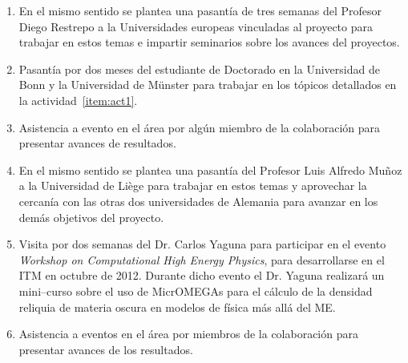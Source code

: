 \begin{enumerate}
\item En el mismo sentido se plantea una pasantía de tres semanas del
  Profesor Diego Restrepo a la Universidades europeas vinculadas al
  proyecto para trabajar en estos temas e impartir seminarios sobre
  los avances del proyectos. 
  \label{item:act5}

\item Pasantía por dos meses del estudiante de Doctorado en la
  Universidad de Bonn y la Universidad de Münster para trabajar en
  los tópicos detallados en la actividad~\ref{item:act1}.
  \label{item:act6}
\item Asistencia a evento en el área por algún miembro de la
  colaboración para presentar avances de resultados.

\item En el mismo sentido se plantea una pasantía del Profesor Luis
  Alfredo Muñoz a la Universidad de Liège para trabajar en estos temas y
  aprovechar la cercanía con las otras dos universidades de Alemania
  para avanzar en los demás objetivos del proyecto.
  \label{item:act8}
\item Visita por dos semanas del Dr. Carlos Yaguna para participar en
  el evento \emph{Workshop on Computational High Energy Physics}, para
  desarrollarse en el ITM en octubre de 2012. Durante dicho evento el
  Dr. Yaguna realizará un mini--curso sobre el uso de MicrOMEGAs para
  el cálculo de la densidad reliquia de materia oscura en modelos de física
  más allá del ME.
  \label{item:act9}
\item Asistencia a eventos en el área por miembros de la
  colaboración para presentar avances de los resultados.
\end{enumerate}




